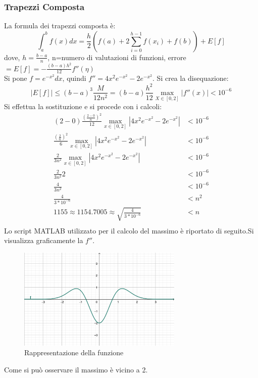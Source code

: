 \documentclass[11pt]{article}
\begin{document}
\subsubsection{Trapezzi Composta}
La formula dei trapezzi composta è:
\[
\int_a^bf(x)dx=\frac{h}{2}(f(a)+2\sum_{i=0}^{h-1}f(x_i)+f(b))+E[f]
\]
dove, $h=\frac{b-a}{n}$, n=numero di valutazioni di funzioni, errore $=E[f]=-\frac{(b-a)h^2}{12}f''(\eta)$\\
Si pone $f=e^{-x^2}dx$, quindi $f''=4x^2e^{-x^2} - 2e^{-x^2}$.
Si crea la disequazione:
\[
|E[f]|\leq(b-a)^3\frac{M}{12n^2}=(b-a)\frac{h^2}{12}\max_{X\in[0,2]}|f''(x)| < 10^{-6}
\]
Si effettua la sostituzione e si procede con i calcoli:
\begin{align*}
	(2-0)\frac{{(\frac{2-0}{n})}^2}{12}\max_{x\in[0,2]}|4x^2e^{-x^2} - 2e^{-x^2}| &< 10^{-6}\\
	\frac{{(\frac{2}{n})}^2}{6}\max_{x\in[0,2]}|4x^2e^{-x^2} - 2e^{-x^2}| &< 10^{-6}\\
	\frac{2}{3n^2}\max_{x\in[0,2]}|4x^2e^{-x^2} - 2e^{-x^2}| &< 10^{-6}\\
	\frac{2}{3n^2}2 &< 10^{-6}\\
	\frac{4}{3n^2} &< 10^{-6}\\
	\frac{4}{3*10^{-6}} &< n^2\\
	1155\approx1154.7005\approx \sqrt{\frac{4}{3*10^{-6}}} &< n\\
\end{align*}
Lo script MATLAB utilizzato per il calcolo del massimo è riportato di seguito.Si visualizza graficamente la $f''$.
\begin{figure}[H]
  \centering
  \includegraphics[width=0.7\textwidth]{images/funzione_max.png} 
  \caption{Rappresentazione della funzione}
  \label{fig:funzione}
\end{figure}
Come si può osservare il massimo è vicino a 2.
\end{document}
